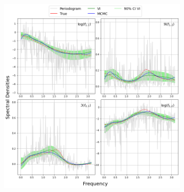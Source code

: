 \documentclass[12pt,a4paper]{article}
\begin{document}
\begin{figure}[H]
\begin{subfigure}{\textwidth} %
  \centering
  \includegraphics[width=18cm]{VAR(2) with length 512 by variational inference and VNPC.png}
\end{subfigure}


\end{figure}
\end{document}
